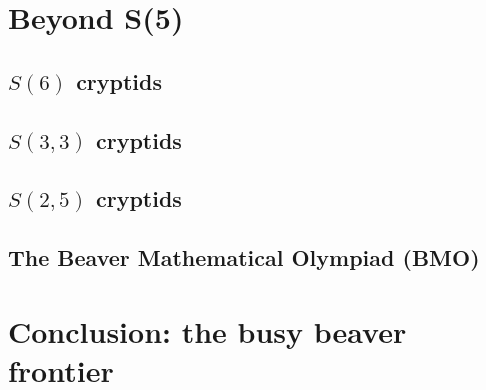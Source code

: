\documentclass[a4paper,british]{article}
\theoremstyle{definition} %
\numberwithin{equation}{section}
\theoremstyle{definition} %
\begin{document}
\section{Beyond S(5)}

\subsection{$S(6)$ cryptids}
\subsection{$S(3,3)$ cryptids}
\subsection{$S(2,5)$ cryptids}
\subsection{The Beaver Mathematical Olympiad (BMO)}

\section{Conclusion: the busy beaver frontier}


\newpage

\end{document}
